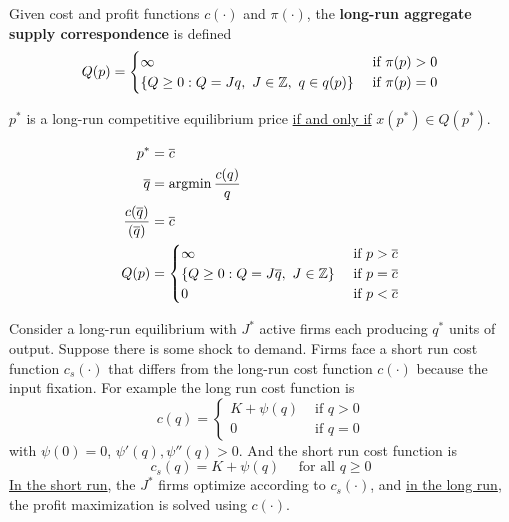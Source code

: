 \documentclass{report}
\begin{document}
		\begin{definition}
			Given cost and profit functions $c(\cdot)$ and $\pi(\cdot)$, the \textbf{long-run aggregate supply correspondence} is defined
			\begin{equation}
				Q(p) = \begin{cases}
					\infty &\text{{ if }} \pi(p) > 0 \\
					\left\{
						Q \geq 0: Q = Jq,\ J \in \mathbb{Z},\ q \in q(p)
					\right\} &\text{{ if }} \pi(p) = 0
				\end{cases}
			\end{equation}
		\end{definition}
		
		\begin{proposition}
			$p^*$ is a long-run competitive equilibrium price \ul{if and only if} $x(p^*) \in Q(p^*)$.
		\end{proposition}
		
		\begin{example}
			\begin{align}
				p^* &= \overline{c} \\
				\overline{q} &= \operatorname*{argmin} \frac{c(q)}{q} \\
				\frac{c(\overline{q})}{(\overline{q})} &= \overline{c} \\
				Q(p) &= \begin{cases}
					\infty &\text{{ if }} p > \overline{c} \\
					\left\{Q \geq 0: Q = J \overline{q},\ J \in \mathbb{Z} \right\} &\text{{ if }} p = \overline{c} \\
					0 &\text{{ if }} p < \overline{c}
				\end{cases}
			\end{align}
		\end{example}
		
		\begin{example}
			Consider a long-run equilibrium with $J^*$ active firms each producing $q^*$ units of output. Suppose there is some shock to demand. Firms face a short run cost function $c_s(\cdot)$ that differs from the long-run cost function $c(\cdot)$ because the input fixation. For example the long run cost function is 
			\begin{equation}
				c(q)=\left\{\begin{array}{ll}{K+\psi(q)} & {\text { if } q>0} \\ {0} & {\text { if } q=0}\end{array}\right.
			\end{equation}
			with $\psi(0) = 0$, $\psi'(q), \psi''(q) > 0$. And the short run cost function is 
			\begin{equation}
				c_{s}(q)=K+\psi(q) \quad \text { for all } q \geq 0
			\end{equation}
			\ul{In the short run}, the $J^*$ firms optimize according to $c_s(\cdot)$, and \ul{in the long run}, the profit maximization is solved using $c(\cdot)$.
		\end{example}
		
\end{document}
